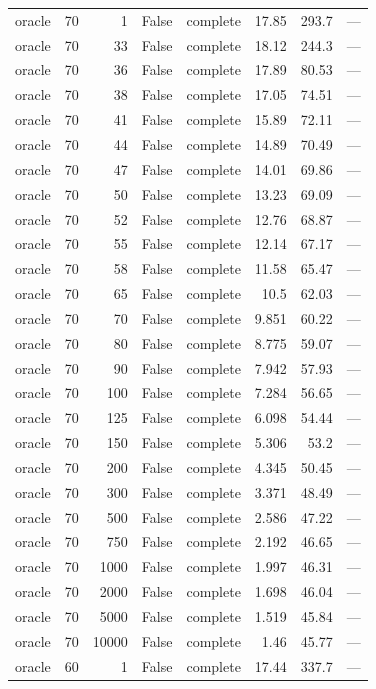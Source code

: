 \begin{tabular}{lrrrlrrl}
oracle & 70 & 1 & False & complete & 17.85 & 293.7 & — \\
oracle & 70 & 33 & False & complete & 18.12 & 244.3 & — \\
oracle & 70 & 36 & False & complete & 17.89 & 80.53 & — \\
oracle & 70 & 38 & False & complete & 17.05 & 74.51 & — \\
oracle & 70 & 41 & False & complete & 15.89 & 72.11 & — \\
oracle & 70 & 44 & False & complete & 14.89 & 70.49 & — \\
oracle & 70 & 47 & False & complete & 14.01 & 69.86 & — \\
oracle & 70 & 50 & False & complete & 13.23 & 69.09 & — \\
oracle & 70 & 52 & False & complete & 12.76 & 68.87 & — \\
oracle & 70 & 55 & False & complete & 12.14 & 67.17 & — \\
oracle & 70 & 58 & False & complete & 11.58 & 65.47 & — \\
oracle & 70 & 65 & False & complete & 10.5 & 62.03 & — \\
oracle & 70 & 70 & False & complete & 9.851 & 60.22 & — \\
oracle & 70 & 80 & False & complete & 8.775 & 59.07 & — \\
oracle & 70 & 90 & False & complete & 7.942 & 57.93 & — \\
oracle & 70 & 100 & False & complete & 7.284 & 56.65 & — \\
oracle & 70 & 125 & False & complete & 6.098 & 54.44 & — \\
oracle & 70 & 150 & False & complete & 5.306 & 53.2 & — \\
oracle & 70 & 200 & False & complete & 4.345 & 50.45 & — \\
oracle & 70 & 300 & False & complete & 3.371 & 48.49 & — \\
oracle & 70 & 500 & False & complete & 2.586 & 47.22 & — \\
oracle & 70 & 750 & False & complete & 2.192 & 46.65 & — \\
oracle & 70 & 1000 & False & complete & 1.997 & 46.31 & — \\
oracle & 70 & 2000 & False & complete & 1.698 & 46.04 & — \\
oracle & 70 & 5000 & False & complete & 1.519 & 45.84 & — \\
oracle & 70 & 10000 & False & complete & 1.46 & 45.77 & — \\
oracle & 60 & 1 & False & complete & 17.44 & 337.7 & — \\

\end{tabular}

